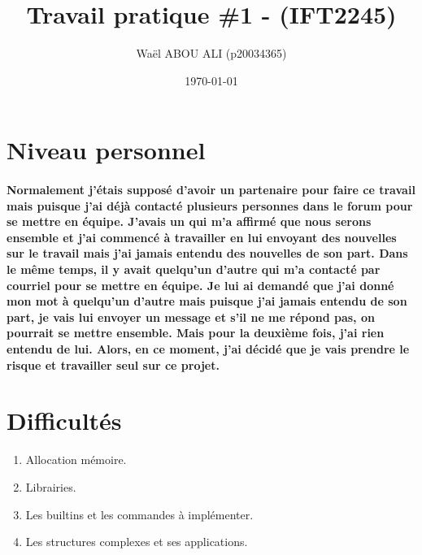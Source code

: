 \documentclass{article}
\begin{document}
\title{Travail pratique \#1 - (IFT2245)} 

\author{Wa\"{e}l ABOU ALI (p20034365)}
\date{\today}

\begin{titlingpage}
\maketitle

\end{titlingpage}







\section{Niveau personnel}

\paragraph{Normalement j'étais supposé d'avoir un partenaire pour faire ce travail mais puisque j'ai déjà contacté plusieurs personnes dans le forum pour se mettre en équipe. J'avais un qui m'a affirmé que nous serons ensemble et j'ai commencé à travailler en lui envoyant des nouvelles sur le travail mais j'ai jamais entendu des nouvelles de son part. Dans le même temps, il y avait quelqu'un d'autre qui m'a contacté par courriel pour se mettre en équipe. Je lui ai demandé que j'ai donné mon mot à quelqu'un d'autre mais puisque j'ai jamais entendu de son part, je vais lui envoyer un message et s'il ne me répond pas, on pourrait se mettre ensemble. Mais pour la deuxième fois, j'ai rien entendu de lui. Alors, en ce moment, j'ai décidé que je vais prendre le risque et travailler seul sur ce projet.}

\section{Difficultés}
\begin{enumerate}
\item Allocation mémoire.
\item Librairies.
\item Les builtins et les commandes à implémenter.
\item Les structures complexes et ses applications.
\end{enumerate}
\end{document}
